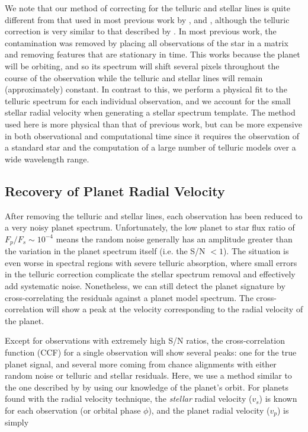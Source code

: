 We note that our method of correcting for the telluric and stellar lines is quite different from that used in most previous work by \cite{Brogi2012, Brogi2013}, and \cite{deKok2013}, although the telluric correction is very similar to that described by \cite{Rodler2012}. In most previous work, the contamination was removed by placing all observations of the star in a matrix and removing features that are stationary in time. This works because the planet will be orbiting, and so its spectrum will shift several pixels throughout the course of the observation while the telluric and stellar lines will remain (approximately) constant. In contrast to this, we perform a physical fit to the telluric spectrum for each individual observation, and we account for the small stellar radial velocity when generating a stellar spectrum template. The method used here is more physical than that of previous work, but can be more expensive in both observational and computational time since it requires the observation of a standard star and the computation of a large number of telluric models over a wide wavelength range.


\subsection{Recovery of Planet Radial Velocity}
\label{paper2_sec:rv_recovery}
After removing the telluric and stellar lines, each observation has
been reduced to a very noisy planet spectrum. Unfortunately, the low
planet to star flux ratio of $F_p/F_s \sim 10^{-4}$ means the
random noise generally has an amplitude greater than the variation in
the planet spectrum itself (i.e. the S/N $<1$). The situation is even worse in spectral regions with severe telluric absorption, where small errors in the telluric correction complicate the stellar spectrum removal and effectively add systematic noise. Nonetheless, we can still detect the planet
signature by cross-correlating the residuals against a planet model
spectrum. The cross-correlation will show a peak at the velocity
corresponding to the radial velocity of the planet. 

Except for observations with extremely high S/N ratios, the cross-correlation function (CCF) for a single observation will show several peaks: one for the true planet signal, and several more coming from chance alignments with either random noise or telluric and stellar residuals. Here, we use a method similar to the one described by \cite{Brogi2012, Brogi2013} by using our knowledge of the planet's orbit. For planets found with the radial velocity technique, the \emph{stellar} radial velocity ($v_s$) is known for each observation (or orbital phase $\phi$), and the planet radial velocity ($v_p$) is simply

